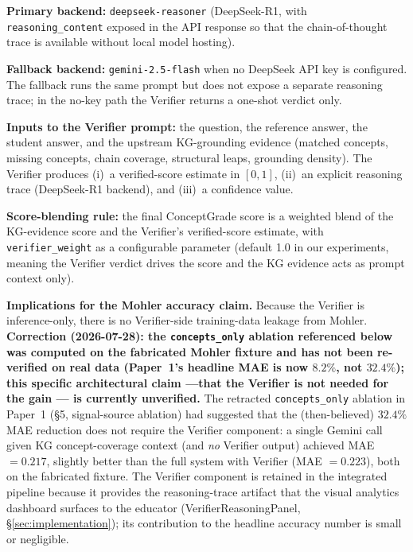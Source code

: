 \documentclass[journal,review]{vgtc}
\begin{document}
\textbf{Primary backend:} \texttt{deepseek-reasoner} (DeepSeek-R1, with
\texttt{reasoning\_content} exposed in the API response so that the
chain-of-thought trace is available without local model hosting).

\textbf{Fallback backend:} \texttt{gemini-2.5-flash} when no DeepSeek API
key is configured. The fallback runs the same prompt but does not expose
a separate reasoning trace; in the no-key path the Verifier returns a
one-shot verdict only.

\textbf{Inputs to the Verifier prompt:} the question, the reference
answer, the student answer, and the upstream KG-grounding evidence
(matched concepts, missing concepts, chain coverage, structural leaps,
grounding density). The Verifier produces (i)~a verified-score estimate
in $[0, 1]$, (ii)~an explicit reasoning trace (DeepSeek-R1 backend), and
(iii)~a confidence value.

\textbf{Score-blending rule:} the final ConceptGrade score is a weighted
blend of the KG-evidence score and the Verifier's verified-score
estimate, with \texttt{verifier\_weight} as a configurable parameter
(default 1.0 in our experiments, meaning the Verifier verdict drives the
score and the KG evidence acts as prompt context only).

\textbf{Implications for the Mohler accuracy claim.} Because the Verifier
is inference-only, there is no Verifier-side training-data leakage from
Mohler. \textbf{Correction (2026-07-28): the \texttt{concepts\_only}
ablation referenced below was computed on the fabricated Mohler fixture
and has not been re-verified on real data (Paper~1's headline MAE is now
$8.2\%$, not $32.4\%$); this specific architectural claim ---that the
Verifier is not needed for the gain --- is currently unverified.} The
retracted \texttt{concepts\_only} ablation in Paper~1
(\S5, signal-source ablation) had suggested that the (then-believed)
$32.4\%$ MAE reduction does not require the Verifier component: a single
Gemini call given KG concept-coverage context (and \emph{no} Verifier
output) achieved MAE $= 0.217$, slightly better than the full system
with Verifier (MAE $= 0.223$), both on the fabricated fixture. The Verifier component is retained in
the integrated pipeline because it provides the reasoning-trace
artifact that the visual analytics dashboard surfaces to the educator
(VerifierReasoningPanel, \S\ref{sec:implementation}); its contribution to the
headline accuracy number is small or negligible.
\end{document}
